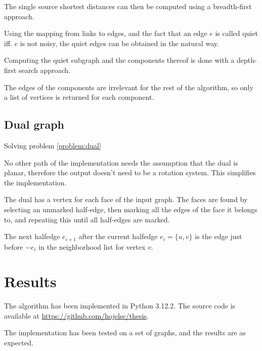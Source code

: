 \documentclass{article}
\begin{document}
			The single source shortest distances can then be computed using a breadth-first approach.

			Using the mapping from links to edges, and the fact that an edge $e$ is called quiet iff. $e$ is not noisy, the quiet edges can be obtained in the natural way.

			Computing the quiet subgraph and the components thereof is done with a depth-first search approach.

			The edges of the components are irrelevant for the rest of the algorithm, so only a list of vertices is returned for each component.


		\subsection{Dual graph}\label{impl:dual}

			Solving problem \ref{problem:dual}

			No other path of the implementation needs the assumption that the dual is planar, therefore the output doesn't need to be a rotation system. This simplifies the implementation.

			The dual has a vertex for each face of the input graph. The faces are found by selecting an unmarked half-edge, then marking all the edges of the face it belongs to, and repeating this until all half-edges are marked.

			The next halfedge $e_{i+1}$ after the current halfedge $e_i = \{u, v\}$ is the edge just before $-e_i$ in the neighborhood list for vertex $v$.


\section{Results}

	The algorithm has been implemented in Python 3.12.2. The source code is available at \url{https://github.com/hojelse/thesis}.
	
	The implementation has been tested on a set of graphs, and the results are as expected. 



\end{document}
